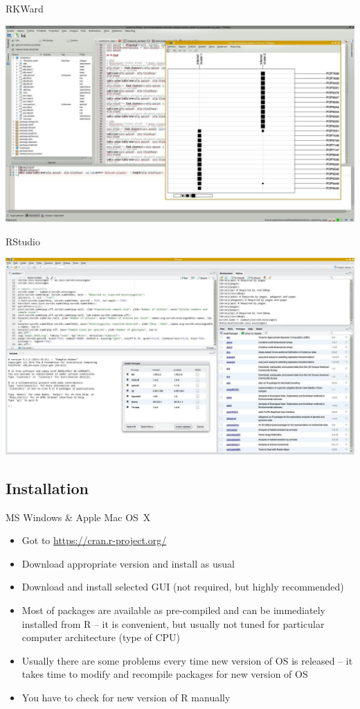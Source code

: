 \documentclass[compress, ucs, xelatex, 11pt, xcolor=svgnames,
  hyperref={
    bookmarks=true,
    unicode=true,
    colorlinks=true,
    pdftitle={Molecular data in R},
    plainpages=false,
    pdfauthor={Vojtech Zeisek},
    pdfsubject={Course about phylogeny and evolution in R},
    pdfcreator={XeLaTeX},
    pdfkeywords={R, evolution, phylogeny, molecular data},
    linkcolor=Tomato,
    anchorcolor=SaddleBrown,
    citecolor=Goldenrod,
    filecolor=DarkMagenta,
    menucolor=Sienna,
    urlcolor=DarkTurquoise,
    pdftex},
  url={hyphens, lowtilde} %
  ]{beamer}
\begin{document}
\begin{frame}{RKWard}
\begin{center}
  \includegraphics[width=\textwidth]{rkward.jpg}
\end{center}
\end{frame}

\begin{frame}{RStudio}
\begin{center}
  \includegraphics[width=\textwidth]{rstudio.jpg}
\end{center}
\end{frame}

\subsection{Installation}

\begin{frame}{MS Windows \& Apple Mac OS~X}
\begin{itemize}
 \item Got to \url{https://cran.r-project.org/}
 \item Download appropriate version and install as usual
 \item Download and install selected GUI (not required, but highly recommended)
 \item Most of packages are available as pre-compiled and can be immediately installed from R -- it is convenient, but usually not tuned for particular computer architecture (type of CPU)
 \item Usually there are some problems every time new version of OS is released -- it takes time to modify and recompile packages for new version of OS
 \item You have to check for new version of R manually
\end{itemize}
\end{frame}
\end{document}

